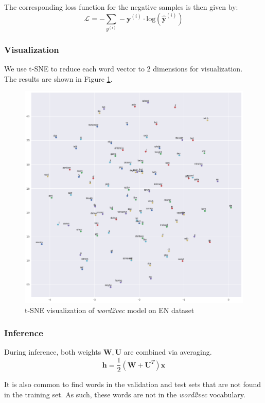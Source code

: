 \documentclass{article}
\numberwithin{equation}{section}
\begin{document}
The corresponding loss function for the negative samples is then given by:
	$$ \mathcal{L} = -\sum_{y^{(i)}} -\bm{y}^{(i)} \cdot \text{log}(\hat{\bm{y}}^{(i)}) $$

\subsubsection{Visualization}
We use t-SNE to reduce each word vector to 2 dimensions for visualization.\\
The results are shown in Figure \ref{fig:word2vec}.

\begin{figure}[h]
	\centering
	\includegraphics[width=0.9\linewidth]{assets/word2vec.png}
	\caption{t-SNE visualization of \emph{word2vec} model on EN dataset}
	\label{fig:word2vec}
\end{figure}

\subsubsection{Inference}
During inference, both weights $\bm{W}, \bm{U}$ are combined via averaging.
	$$ \bm{h} = \frac{1}{2}(\bm{W} + \bm{U}^T) \bm{x} $$

It is also common to find words in the validation and test sets that are not found in the training set. As such, these words are not in the \emph{word2vec} vocabulary. \\
\end{document}
